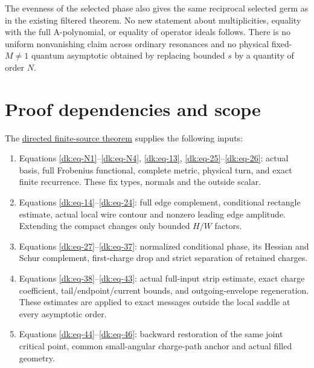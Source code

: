 The evenness of the selected phase also gives the same reciprocal selected germ as in the existing filtered theorem. No new statement about multiplicities, equality with the full A-polynomial, or equality of operator ideals follows. There is no uniform nonvanishing claim across ordinary resonances and no physical fixed-\(M\ne1\) quantum asymptotic obtained by replacing bounded \(s\) by a quantity of order \(N\).

\section{Proof dependencies and scope}\label{dao:sec-9}

The \href{https://sashakolpakov.github.io/murakamis_dream/notes/actual_all_circle_directed_volume.html}{directed finite-source theorem} supplies the following inputs:

\begin{enumerate}
\def\labelenumi{\arabic{enumi}.}

\item
  Equations \eqref{dk:eq-N1}--\eqref{dk:eq-N4}, \eqref{dk:eq-13}, \eqref{dk:eq-25}--\eqref{dk:eq-26}: actual basis, full Frobenius functional, complete metric, physical turn, and exact finite recurrence. These fix types, normals and the outside scalar.
\item
  Equations \eqref{dk:eq-14}--\eqref{dk:eq-24}: full edge complement, conditional rectangle estimate, actual local wire contour and nonzero leading edge amplitude. Extending the compact changes only bounded \(H/W\) factors.
\item
  Equations \eqref{dk:eq-27}--\eqref{dk:eq-37}: normalized conditional phase, its Hessian and Schur complement, first-charge drop and strict separation of retained charges.
\item
  Equations \eqref{dk:eq-38}--\eqref{dk:eq-43}: actual full-input strip estimate, exact charge coefficient, tail/endpoint/current bounds, and outgoing-envelope regeneration. These estimates are applied to exact messages outside the local saddle at every asymptotic order.
\item
  Equations \eqref{dk:eq-44}--\eqref{dk:eq-46}: backward restoration of the same joint critical point, common small-angular charge-path anchor and actual filled geometry.
\end{enumerate}

